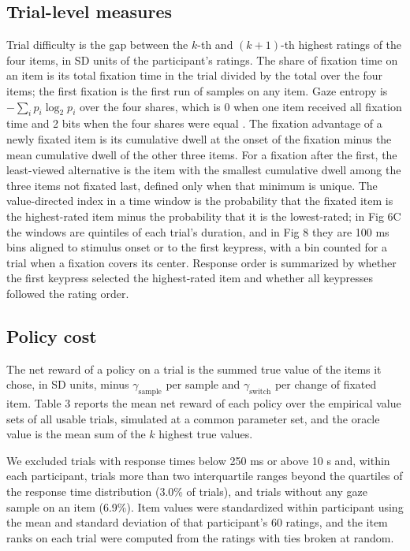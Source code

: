 \documentclass[10pt,letterpaper]{article}
\begin{document}
\subsection*{Trial-level measures}\label{trial-level-measures}

Trial difficulty is the gap between the \(k\)-th and \((k+1)\)-th
highest ratings of the four items, in SD units of the participant's
ratings. The share of fixation time on an item is its total fixation
time in the trial divided by the total over the four items; the first
fixation is the first run of samples on any item. Gaze entropy is
\(-\sum_i p_i \log_2 p_i\) over the four shares, which is 0 when one
item received all fixation time and 2 bits when the four shares were
equal \cite{fromer2026}. The fixation advantage of a newly fixated item
is its cumulative dwell at the onset of the fixation minus the mean
cumulative dwell of the other three items. For a fixation after the
first, the least-viewed alternative is the item with the smallest
cumulative dwell among the three items not fixated last, defined only
when that minimum is unique. The value-directed index in a time window
is the probability that the fixated item is the highest-rated item minus
the probability that it is the lowest-rated; in Fig 6C the windows are
quintiles of each trial's duration, and in Fig 8 they are 100 ms bins
aligned to stimulus onset or to the first keypress, with a bin counted
for a trial when a fixation covers its center. Response order is
summarized by whether the first keypress selected the highest-rated item
and whether all keypresses followed the rating order.

\subsection*{Policy cost}\label{policy-cost}

The net reward of a policy on a trial is the summed true value of the
items it chose, in SD units, minus \(\gamma_{\text{sample}}\) per sample
and \(\gamma_{\text{switch}}\) per change of fixated item. Table 3
reports the mean net reward of each policy over the empirical value sets
of all usable trials, simulated at a common parameter set, and the
oracle value is the mean sum of the \(k\) highest true values.

We excluded trials with response times below 250 ms or above 10 s and,
within each participant, trials more than two interquartile ranges
beyond the quartiles of the response time distribution (3.0\% of
trials), and trials without any gaze sample on an item (6.9\%). Item
values were standardized within participant using the mean and standard
deviation of that participant's 60 ratings, and the item ranks on each
trial were computed from the ratings with ties broken at random.
\end{document}

